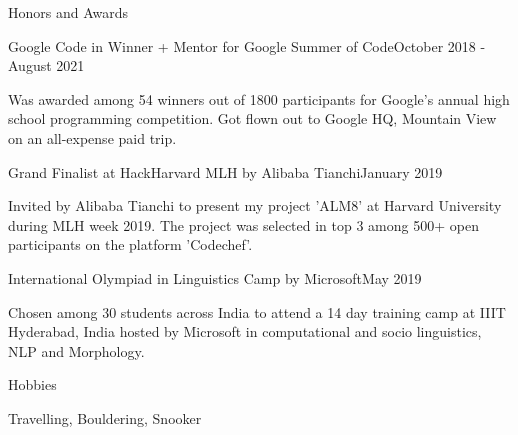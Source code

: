 \documentclass[
	a4paper, %
	11pt, %
]{resume} %
\begin{document}
\begin{rSection}{Honors and Awards}

	\begin{achSubsection}{Google Code in Winner + Mentor for Google Summer of Code}{October 2018 - August 2021}
		\item Was awarded among 54 winners out of 1800 participants for Google's annual high school programming competition. Got flown out to Google HQ, Mountain View on an all-expense paid trip.
	\end{achSubsection}




	\begin{achSubsection}{Grand Finalist at HackHarvard MLH by Alibaba Tianchi}{January 2019}
		\item Invited by Alibaba Tianchi to present my project 'ALM8' at Harvard University during MLH week 2019. The project was selected in top 3 among 500+ open participants on the platform 'Codechef'.
	\end{achSubsection}


	\begin{achSubsection}{International Olympiad in Linguistics Camp by Microsoft}{May 2019}
		\item Chosen among 30 students across India to attend a 14 day training camp at IIIT Hyderabad, India hosted by Microsoft in computational and socio linguistics, NLP and Morphology.
	\end{achSubsection}

\end{rSection}

\begin{rSection}{Hobbies}

	Travelling, Bouldering, Snooker


\end{rSection}
\end{document}
